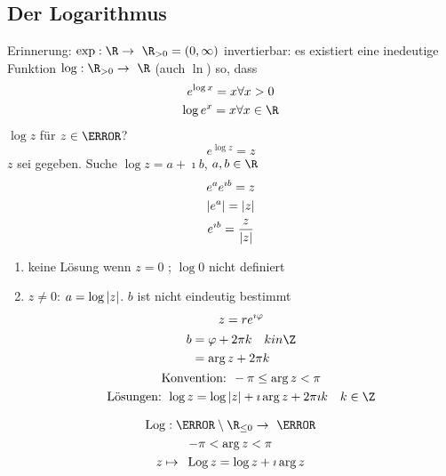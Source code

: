 \subsection{Der Logarithmus}
Erinnerung: $\exp : \R \rightarrow \R_{>0} = ( 0 , \infty )$ invertierbar: es existiert eine inedeutige Funktion $\log : \R_{>0} \rightarrow \R$ (auch $\ln$) so, dass
\begin{gather*}
	e^{\log x} = x \forall x > 0 \\
	\log e^x = x \forall x \in \R
\end{gather*}
$\log z$ für $z \in \C$? \\
\[ e^{\log z} = z \]
$z$ sei gegeben. Suche $\log z = a + \imath b$, $a,b \in \R$
\begin{gather*}
	e^a e^{\imath b} = z \\
	\abs{e^a} = \abs{ z} \\
	e^{\imath b} = \frac{z}{\abs{z}}
\end{gather*}
\begin{enumerate}[label=(\alph*)]
	\item keine Lösung wenn $z=0$ ; $\log 0$ nicht definiert
	\item $z \neq 0$: $a = \log \abs{z}$. $b$ ist nicht eindeutig bestimmt
		\begin{gather*}
			z = r e^{\imath \varphi} \\
			\begin{split}
				b	&= \varphi + 2\pi k \quad k in \Z \\
					&= \arg z + 2\pi k
			\end{split} \\
			\text{Konvention: } -\pi \leq \arg z < \pi \\
			\text{Lösungen: } \log z = \log \abs{z} + \imath \arg z + 2\pi\imath k \quad k \in \Z
		\end{gather*}
\end{enumerate}
\begin{def*}[note = Hauptwert des Logarithmus , index = Hauptwert des Logarithmus , indexformat = {3!12~}]
	\begin{gather*}
		\Log : \C \setminus \R_{\leq 0} \rightarrow \C \\
		-\pi < \arg z < \pi \\
		z \mapsto \Log z = \log z + \imath \arg z
	\end{gather*}
\end{def*}
